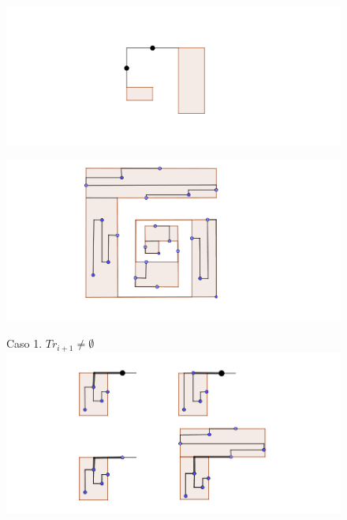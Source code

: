 \documentclass{beamer}
\begin{document}
\begin{frame}
\begin{figure}[h]
\includegraphics[width=\textwidth]{Dummy-point}
\end{figure}
\end{frame}
\begin{frame}
\begin{figure}[h]
\includegraphics[width=\textwidth]{Poligono-con-planos-5}
\end{figure}
\end{frame}
\begin{frame}
\begin{figure}[h]
Caso 1. $Tr_{i+1} \neq \emptyset$
\includegraphics[width=\textwidth]{Caso-1}
\end{figure}
\end{frame}
\end{document}
